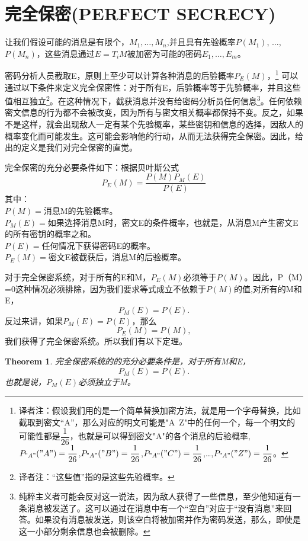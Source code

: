 \documentclass[]{article}
\newtheorem{theorem}{Theorem}
\begin{document}
\newpage
%   
%

\section{完全保密(PERFECT SECRECY)}

让我们假设可能的消息是有限个，$M_1,\ldots,M_n$,并且具有先验概率$P(M_1)$, $\ldots$, $P(M_n)$，这些消息通过$E=T_i M$被加密为可能的密码$E_1,\ldots,E_m$。

密码分析人员截取E，原则上至少可以计算各种消息的后验概率$P_E(M)$，\footnote{译者注：假设我们用的是一个简单替换加密方法，就是用一个字母替换，比如截取到密文“A”，那么对应的明文可能是"A~Z"中的任何一个，每一个明文的可能性都是$\dfrac{1}{26}$，也就是可以得到密文"A"的各个消息的后验概率,$P_{"A"}("A")=\dfrac{1}{26}$,$P_{"A"}("B")=\dfrac{1}{26}$,$P_{"A"}("C")=\dfrac{1}{26}$,\ldots,$P_{"A"}("Z")=\dfrac{1}{26}$。}
可以通过以下条件来定义完全保密性：对于所有E，后验概率等于先验概率，并且这些值相互独立\footnote{译者注：“这些值”指的是这些先验概率。}。在这种情况下，截获消息并没有给密码分析员任何信息\footnote{纯粹主义者可能会反对这一说法，因为敌人获得了一些信息，至少他知道有一条消息被发送了。这可以通过在消息中有一个“空白”对应于“没有消息”来回答。如果没有消息被发送，则该空白将被加密并作为密码发送，那么，即使是这一小部分剩余信息也会被删除。}。任何依赖密文信息的行为都不会被改变，因为所有与密文相关概率都保持不变。反之，如果不是这样，就会出现敌人一定有某个先验概率，某些密钥和信息的选择，因敌人的概率变化而可能发生。这可能会影响他的行动，从而无法获得完全保密。因此，给出的定义是我们对完全保密的直觉。

完全保密的充分必要条件如下：根据贝叶斯公式
\[P_E(M)=\dfrac{P(M)P_M(E)}{P(E)}\]
其中：\\
$P(M)=$消息M的先验概率。\\
$P_M(E)=$如果选择消息M时，密文E的条件概率，也就是，从消息M产生密文E的所有密钥的概率之和。\\
$P(E)=$任何情况下获得密码E的概率。\\
$P_E(M)=$密文E被截获后，消息M的后验概率。\par

对于完全保密系统，对于所有的E和M，$P_E(M)$必须等于$P(M)$。因此，P（M）=0这种情况必须排除，因为我们要求等式成立不依赖于$P(M)$的值,对所有的M和E，
\[P_M(E)=P(E).\]
反过来讲，如果$P_M(E)=P(E)$，那么
\[P_E(M)=P(M),\]
我们获得了完全保密系统。所以我们有以下定理。

\begin{theorem}
	完全保密系统的的充分必要条件是，对于所有M和E，
	\[P_M(E)=P(E).\]
	也就是说，$P_M(E)$必须独立于M。
\end{theorem}
\end{document}
